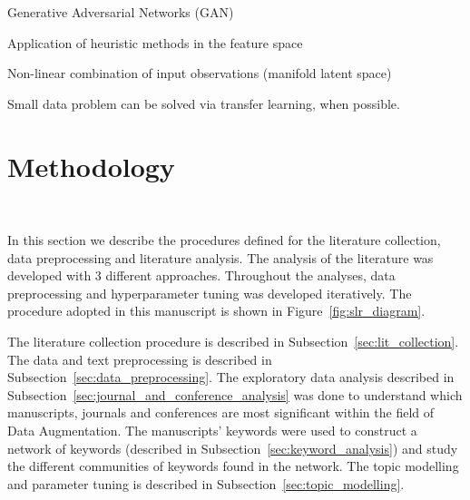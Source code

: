 \documentclass[parskip=full]{scrartcl}
\begin{document}
Generative Adversarial Networks (GAN)~\cite{Goodfellow2014} 

Application of heuristic methods in the feature space

Non-linear combination of input observations (manifold latent space)

Small data problem can be solved via transfer learning, when possible.


% 
%
%

\section{Methodology}~\label{sec:methodology}

In this section we describe the procedures defined for the literature
collection, data preprocessing and literature analysis. The analysis of the
literature was developed with 3 different approaches. Throughout the
analyses, data preprocessing and hyperparameter tuning was developed
iteratively. The procedure adopted in this manuscript is shown in
Figure~\ref{fig:slr_diagram}.

The literature collection procedure is described in
Subsection~\ref{sec:lit_collection}. The data and text preprocessing is
described in Subsection~\ref{sec:data_preprocessing}. The exploratory data
analysis described in Subsection~\ref{sec:journal_and_conference_analysis} was
done to understand which manuscripts, journals and conferences are most
significant within the field of Data Augmentation. The manuscripts' keywords
were used to construct a network of keywords (described in
Subsection~\ref{sec:keyword_analysis}) and study the different communities of
keywords found in the network. The topic modelling and parameter tuning is
described in Subsection~\ref{sec:topic_modelling}. 
\end{document}
